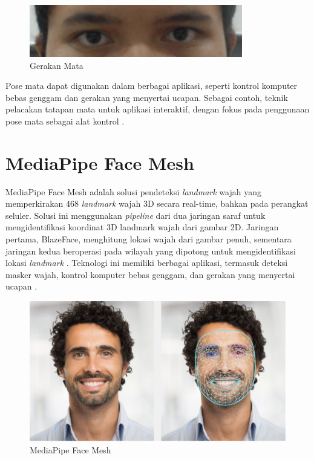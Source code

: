 \begin{figure} [ht] \centering
    \includegraphics[width=.6\textwidth]{gambar/bab3/gaze.png}
    \caption{Gerakan Mata}
    \label{fig:gaze}
\end{figure}

Pose mata dapat digunakan dalam berbagai aplikasi, seperti kontrol komputer bebas genggam  dan gerakan yang menyertai ucapan. Sebagai contoh, teknik pelacakan tatapan mata untuk aplikasi interaktif, dengan fokus pada penggunaan pose mata sebagai alat kontrol \parencite{Morimoto_Mimica_2005}. 

\section{MediaPipe Face Mesh}

MediaPipe Face Mesh adalah solusi pendeteksi \textit{landmark} wajah yang memperkirakan 468 \textit{landmark} wajah 3D secara real-time, bahkan pada perangkat seluler. Solusi ini menggunakan \textit{pipeline} dari dua jaringan saraf untuk mengidentifikasi koordinat 3D landmark wajah dari gambar 2D. Jaringan pertama, BlazeFace, menghitung lokasi wajah dari gambar penuh, sementara jaringan kedua beroperasi pada wilayah yang dipotong untuk mengidentifikasi lokasi \textit{landmark} \parencite{mediapipe_2020}. Teknologi ini memiliki berbagai aplikasi, termasuk deteksi masker wajah, kontrol komputer bebas genggam, dan gerakan yang menyertai ucapan \parencite{thaman_2022}.

\begin{figure} [ht] \centering
    \includegraphics[width=.55\textwidth]{gambar/face_landmark.png}
    \caption{MediaPipe Face Mesh}
    \label{fig:facemesh}
\end{figure}

